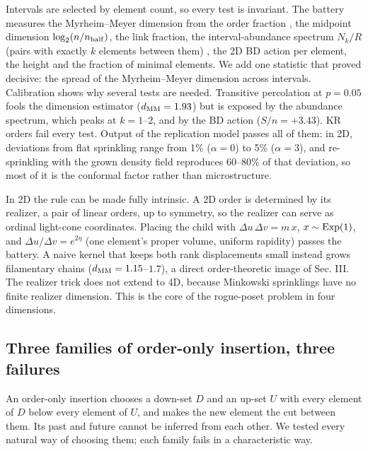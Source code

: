 Intervals are selected by element count, so every test is
invariant. The battery measures the Myrheim--Meyer dimension
from the order fraction \cite{Myrheim78, Meyer88}, the
midpoint dimension \(\log_2(n/n_{\rm half})\), the link
fraction, the interval-abundance spectrum \(N_k/R\) (pairs
with exactly \(k\) elements between them) \cite{GS13}, the
2D BD action per element, the height and the fraction of
minimal elements. We add one statistic that proved decisive:
the spread of the Myrheim--Meyer dimension across intervals.
Calibration shows why several tests are needed. Transitive
percolation at \(p=0.05\) fools the dimension estimator
(\(d_{\rm MM}=1.93\)) but is exposed by the abundance
spectrum, which peaks at \(k=1\)--\(2\), and by the BD
action (\(S/n=+3.43\)). KR orders fail every test. Output of
the replication model passes all of them: in 2D, deviations
from flat sprinkling range from 1\% (\(\alpha=0\)) to 5\%
(\(\alpha=3\)), and re-sprinkling with the grown density
field reproduces 60--80\% of that deviation, so most of it
is the conformal factor rather than microstructure.

In 2D the rule can be made fully intrinsic. A 2D order is
determined by its realizer, a pair of linear orders, up to
symmetry, so the realizer can serve as ordinal light-cone
coordinates. Placing the child with
\(\Delta u\,\Delta v=m\,x\), \(x\sim{\rm Exp}(1)\), and
\(\Delta u/\Delta v=e^{2\eta}\) (one element's proper
volume, uniform rapidity) passes the battery. A naive kernel
that keeps both rank displacements small instead grows
filamentary chains (\(d_{\rm MM}=1.15\)--\(1.7\)), a direct
order-theoretic image of Sec. III. The realizer trick does
not extend to 4D, because Minkowski sprinklings have no
finite realizer dimension. This is the core of the
rogue-poset problem in four dimensions.

\hypertarget{three-families-of-order-only-insertion-three-failures}{%
\subsection{Three families of order-only insertion, three
failures}\label{three-families-of-order-only-insertion-three-failures}}

An order-only insertion chooses a down-set \(D\) and an
up-set \(U\) with every element of \(D\) below every element
of \(U\), and makes the new element the cut between them.
Its past and future cannot be inferred from each other. We
tested every natural way of choosing them; each family fails
in a characteristic way.

